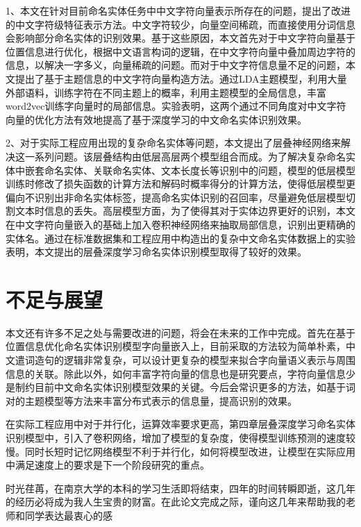 \documentclass[winfonts,master,oneside,nobackinfo]{njuthesis}
\begin{document}
1、本文在针对目前命名实体任务中中文字符向量表示所存在的问题，提出了改进的中文字符级特征表示方法。中文字符较少，向量空间稀疏，而直接使用分词信息会影响部分命名实体的识别效果。基于这些原因，本文首先对于中文字符向量基于位置信息进行优化，根据中文语言构词的逻辑，在中文字符向量中叠加周边字符的信息，以解决一字多义，向量稀疏的问题。而对于中文字符信息量不足的问题，本文提出了基于主题信息的中文字符向量构造方法。通过LDA主题模型，利用大量外部语料，训练字符在不同主题上的概率，利用主题模型的全局信息，丰富word2vec训练字向量时的局部信息。实验表明，这两个通过不同角度对中文字符向量的优化方法有效地提高了基于深度学习的中文命名实体识别效果。

2、对于实际工程应用出现的复杂命名实体等问题，本文提出了层叠神经网络来解决这一系列问题。该层叠结构由低层高层两个模型组合而成。为了解决复杂命名实体中嵌套命名实体、关联命名实体、文本长度长等识别中的问题，模型的低层模型训练时修改了损失函数的计算方法和解码时概率得分的计算方法，使得低层模型更偏向不识别出非命名实体标签，提高命名实体识别的召回率，尽量避免低层模型切割文本时信息的丢失。高层模型方面，为了使得其对于实体边界更好的识别，本文在中文字符向量嵌入的基础上加入卷积神经网络来抽取局部信息，识别出更精确的实体名。通过在标准数据集和工程应用中构造出的复杂中文命名实体数据上的实验表明，本文提出的层叠深度学习命名实体识别模型取得了较好的效果。

\section{不足与展望}

本文还有许多不足之处与需要改进的问题，将会在未来的工作中完成。首先在基于位置信息优化命名实体识别模型字向量嵌入上，目前采取的方法较为简单朴素，中文遣词造句的逻辑非常复杂，可以设计更复杂的模型来拟合字向量语义表示与周围信息的关联。除此以外，如何丰富字符向量的信息也是研究要点，字符向量信息少是制约目前中文命名实体识别模型效果的关键。今后会常识更多的方法，如基于词对的主题模型等方法来丰富分布式表示的信息量，提高识别的效果。

在实际工程应用中对于并行化，运算效率要求更高，第四章层叠深度学习命名实体识别模型中，引入了卷积网络，增加了模型的复杂度，使得模型训练预测的速度较慢。同时长短时记忆网络模型不利于并行化，如何将模型改进，让模型在实际应用中满足速度上的要求是下一个阶段研究的重点。




\begin{acknowledgement}
时光荏苒，在南京大学的本科的学习生活即将结束，四年的时间转瞬即逝，这几年的经历必将成为我人生宝贵的财富。在此论文完成之际，谨向这几年来帮助我的老师和同学表达最衷心的感

\end{acknowledgement}
\end{document}
